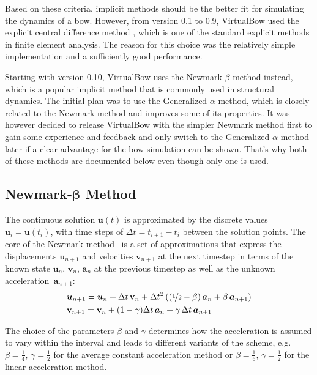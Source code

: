 Based on these criteria, implicit methods should be the better fit for simulating the dynamics of a bow.
However, from version 0.1 to 0.9, VirtualBow used the explicit central difference method \cite{bib:bathe2006}, which is one of the standard explicit methods in finite element analysis.
The reason for this choice was the relatively simple implementation and a sufficiently good performance.

Starting with version 0.10, VirtualBow uses the Newmark-$\beta$ method instead, which is a popular implicit method that is commonly used in structural dynamics.
The initial plan was to use the Generalized-$\alpha$ method, which is closely related to the Newmark method and improves some of its properties.
It was however decided to release VirtualBow with the simpler Newmark method first to gain some experience and feedback and only switch to the Generalized-$\alpha$ method later if a clear advantage for the bow simulation can be shown.
That's why both of these methods are documented below even though only one is used.

\subsection{Newmark-$\boldsymbol{\beta}$ Method}

The continuous solution $\boldsymbol{u}(t)$ is approximated by the discrete values~$\boldsymbol{u}_i = \boldsymbol{u}(t_{i})$, with time steps of $\Delta t = t_{i+1} - t_{i}$ between the solution points.
The core of the Newmark method~\cite{bib:bathe2006} is a set of approximations that express the displacements $\boldsymbol{u}_{n+1}$ and velocities $\mathbf{v}_{n+1}$ at the next timestep in terms of the known state $\boldsymbol{u}_{n}$, $\mathbf{v}_{n}$, $\boldsymbol{a}_{n}$ at the previous timestep as well as the unknown acceleration~$\boldsymbol{a}_{n+1}$:
%
\begin{align}
&\boldsymbol{u}_{n+1} = \boldsymbol{u}_{n} + \Delta t\,\mathbf{v}_{n} + \Delta t^2 \left( \left(\nicefrac{1}{2} - \beta\right)\boldsymbol{a}_{n} + \beta\,\boldsymbol{a}_{n+1} \right) \label{eq:newmark_u} \\
&\mathbf{v}_{n+1} = \mathbf{v}_{n} + (1 - \gamma)\Delta t\,\boldsymbol{a}_{n} + \gamma\,\Delta t\,\boldsymbol{a}_{n+1} \label{eq:newmark_v}
\end{align}

The choice of the parameters $\beta$ and $\gamma$ determines how the acceleration is assumed to vary within the interval and leads to different variants of the scheme, e.g. $\beta = \frac{1}{4},\,\gamma = \frac{1}{2}$ for the average constant acceleration method or $\beta = \frac{1}{6},\,\gamma = \frac{1}{2}$ for the linear acceleration method.

